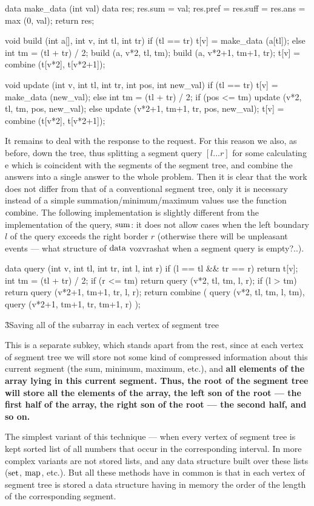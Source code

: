 \code
data make_data (int val) {
data res;
res.sum = val;
res.pref = res.suff = res.ans = max (0, val);
return res;
}

void build (int a[], int v, int tl, int tr) {
if (tl == tr)
t[v] = make_data (a[tl]);
else {
int tm = (tl + tr) / 2;
build (a, v*2, tl, tm);
build (a, v*2+1, tm+1, tr);
t[v] = combine (t[v*2], t[v*2+1]);
}
}

void update (int v, int tl, int tr, int pos, int new_val) {
if (tl == tr)
t[v] = make_data (new_val);
else {
int tm = (tl + tr) / 2;
if (pos <= tm)
update (v*2, tl, tm, pos, new_val);
else
update (v*2+1, tm+1, tr, pos, new_val);
t[v] = combine (t[v*2], t[v*2+1]);
}
}
\endcode

It remains to deal with the response to the request. For this reason we also, as before, down the tree, thus splitting a segment query $[l \ldots r]$ for some calculating e which is coincident with the segments of the segment tree, and combine the answers into a single answer to the whole problem. Then it is clear that the work does not differ from that of a conventional segment tree, only it is necessary instead of a simple summation/minimum/maximum values use the function $\rm combine$. The following implementation is slightly different from the implementation of the query, $\rm sum$: it does not allow cases when the left boundary $l$ of the query exceeds the right border $r$ (otherwise there will be unpleasant events --- what structure of $\rm data$ vozvrashat when a segment query is empty?..).

\code
data query (int v, int tl, int tr, int l, int r) {
if (l == tl && tr == r)
return t[v];
int tm = (tl + tr) / 2;
if (r <= tm)
return query (v*2, tl, tm, l, r);
if (l > tm)
return query (v*2+1, tm+1, tr, l, r);
return combine (
query (v*2, tl, tm, l, tm),
query (v*2+1, tm+1, tr, tm+1, r)
);
}
\endcode


\h3{Saving all of the subarray in each vertex of segment tree}

This is a separate subkey, which stands apart from the rest, since at each vertex of segment tree we will store not some kind of compressed information about this current segment (the sum, minimum, maximum, etc.), and \bf{all} elements of the array lying in this current segment. Thus, the root of the segment tree will store all the elements of the array, the left son of the root --- the first half of the array, the right son of the root --- the second half, and so on.

The simplest variant of this technique --- when every vertex of segment tree is kept sorted list of all numbers that occur in the corresponding interval. In more complex variants are not stored lists, and any data structure built over these lists ($\rm set$, $\rm map$, etc.). But all these methods have in common is that in each vertex of segment tree is stored a data structure having in memory the order of the length of the corresponding segment.

